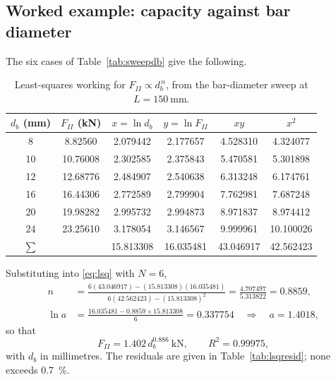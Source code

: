 \subsection*{Worked example: capacity against bar diameter}

The six cases of Table~\ref{tab:sweepdb} give the following.

\begin{table}[H]
\centering
\caption{Least-squares working for $F_{II} \propto d_b^{\,n}$, from the
         bar-diameter sweep at $L = \SI{150}{\milli\metre}$.}
\label{tab:lsqwork}
\small
\begin{tabular*}{\linewidth}{@{\extracolsep{\fill}}cccccc@{}}
\hline
$d_b$ (mm) & $F_{II}$ (kN) & $x = \ln d_b$ & $y = \ln F_{II}$
           & $xy$ & $x^2$ \\
\hline
8  & 8.82560  & 2.079442 & 2.177657 & 4.528310 & 4.324077 \\
10 & 10.76008 & 2.302585 & 2.375843 & 5.470581 & 5.301898 \\
12 & 12.68776 & 2.484907 & 2.540638 & 6.313248 & 6.174761 \\
16 & 16.44306 & 2.772589 & 2.799904 & 7.762981 & 7.687248 \\
20 & 19.98282 & 2.995732 & 2.994873 & 8.971837 & 8.974412 \\
24 & 23.25610 & 3.178054 & 3.146567 & 9.999961 & 10.100026 \\
\hline
$\sum$ & & 15.813308 & 16.035481 & 43.046917 & 42.562423 \\
\hline
\end{tabular*}
\end{table}

Substituting into \eqref{eq:lsq} with $N = 6$,
\begin{align}
n &= \frac{6(43.046917) - (15.813308)(16.035481)}
          {6(42.562423) - (15.813308)^2}
   = \frac{4.707497}{5.313822}
   = 0.8859 , \\[4pt]
\ln a &= \frac{16.035481 - 0.8859 \times 15.813308}{6} = 0.337754
      \quad\Longrightarrow\quad a = 1.4018 ,
\end{align}
so that
\begin{equation}
\label{eq:dbfit}
F_{II} = 1.402\, d_b^{0.886}\ \si{\kilo\newton},
\qquad R^2 = 0.99975 ,
\end{equation}
with $d_b$ in millimetres. The residuals are given in
Table~\ref{tab:lsqresid}; none exceeds \SI{0.7}{\percent}.

